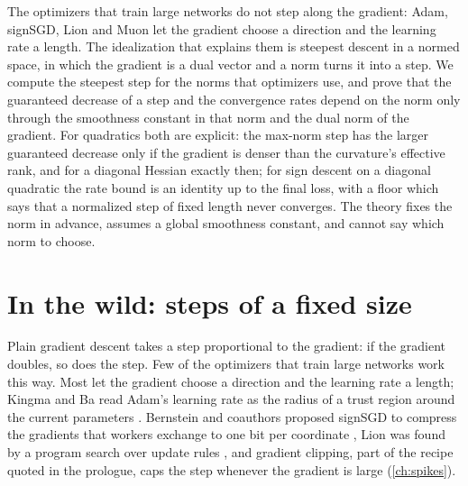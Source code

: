 
\begin{refsection}

\begin{chaptersummary}
The optimizers that train large networks do not step along the gradient: Adam, signSGD, Lion and Muon let the gradient choose a direction and the learning rate a length. The idealization that explains them is steepest descent in a normed space, in which the gradient is a dual vector and a norm turns it into a step. We compute the steepest step for the norms that optimizers use, and prove that the guaranteed decrease of a step and the convergence rates depend on the norm only through the smoothness constant in that norm and the dual norm of the gradient. For quadratics both are explicit: the max-norm step has the larger guaranteed decrease only if the gradient is denser than the curvature's effective rank, and for a diagonal Hessian exactly then; for sign descent on a diagonal quadratic the rate bound is an identity up to the final loss, with a floor which says that a normalized step of fixed length never converges. The theory fixes the norm in advance, assumes a global smoothness constant, and cannot say which norm to choose.
\end{chaptersummary}

\section{In the wild: steps of a fixed size}\label{sec:steepest:wild}

Plain gradient descent takes a step proportional to the gradient: if the gradient doubles, so does the step. Few of the optimizers that train large networks work this way. Most let the gradient choose a direction and the learning rate a length; Kingma and Ba read Adam's learning rate as the radius of a trust region around the current parameters \parencite{KingmaBa2015}. Bernstein and coauthors proposed signSGD to compress the gradients that workers exchange to one bit per coordinate \parencite{BernsteinEtAl2018}, Lion was found by a program search over update rules \parencite{ChenEtAl2023Lion}, and gradient clipping, part of the recipe quoted in the prologue, caps the step whenever the gradient is large (\cref{ch:spikes}).


\end{refsection}
